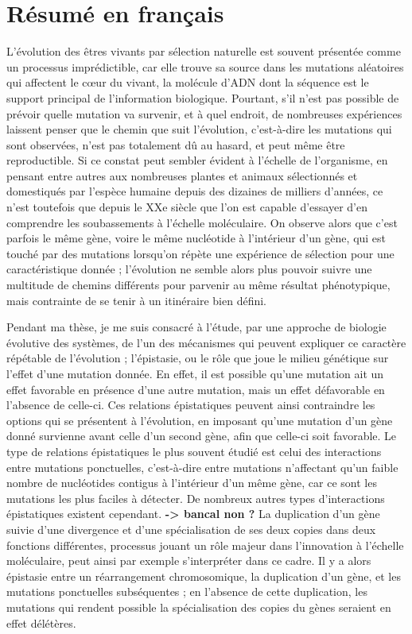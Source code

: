 
\chapter{Résumé en français}

L'évolution des êtres vivants par sélection naturelle est souvent présentée comme un processus imprédictible, car elle trouve sa source dans les mutations aléatoires qui affectent le cœur du vivant, la molécule d'ADN dont la séquence est le support principal de l'information biologique.
Pourtant, s'il n'est pas possible de prévoir quelle mutation va survenir, et à quel endroit, de nombreuses expériences laissent penser que le chemin que suit l'évolution, c'est-à-dire les mutations qui sont observées, n'est pas totalement dû au hasard, et peut même être reproductible.
Si ce constat peut sembler évident à l'échelle de l'organisme, en pensant entre autres aux nombreuses plantes et animaux sélectionnés et domestiqués par l'espèce humaine depuis des dizaines de milliers d'années, ce n'est toutefois que depuis le XXe siècle que l'on est capable d'essayer d'en comprendre les soubassements à l'échelle moléculaire.
On observe alors que c'est parfois le même gène, voire le même nucléotide à l'intérieur d'un gène, qui est touché par des mutations lorsqu'on répète une expérience de sélection pour une caractéristique donnée ; l'évolution ne semble alors plus pouvoir suivre une multitude de chemins différents pour parvenir au même résultat phénotypique, mais contrainte de se tenir à un itinéraire bien défini.

Pendant ma thèse, je me suis consacré à l'étude, par une approche de biologie évolutive des systèmes, de l'un des mécanismes qui peuvent expliquer ce caractère répétable de l'évolution ; l'épistasie, ou le rôle que joue le milieu génétique sur l'effet d'une mutation donnée.
En effet, il est possible qu'une mutation ait un effet favorable en présence d'une autre mutation, mais un effet défavorable en l'absence de celle-ci.
Ces relations épistatiques peuvent ainsi contraindre les options qui se présentent à l'évolution, en imposant qu'une mutation d'un gène donné survienne avant celle d'un second gène, afin que celle-ci soit favorable.
Le type de relations épistatiques le plus souvent étudié est celui des interactions entre mutations ponctuelles, c'est-à-dire entre mutations n'affectant qu'un faible nombre de nucléotides contigus à l'intérieur d'un même gène, car ce sont les mutations les plus faciles à détecter.
De nombreux autres types d'interactions épistatiques existent cependant. \textbf{-> bancal non ?}
La duplication d'un gène suivie d'une divergence et d'une spécialisation de ses deux copies dans deux fonctions différentes, processus jouant un rôle majeur dans l'innovation à l'échelle moléculaire, peut ainsi par exemple s'interpréter dans ce cadre.
Il y a alors épistasie entre un réarrangement chromosomique, la duplication d'un gène, et les mutations ponctuelles subséquentes ; en l'absence de cette duplication, les mutations qui rendent possible la spécialisation des copies du gènes seraient en effet délétères.

